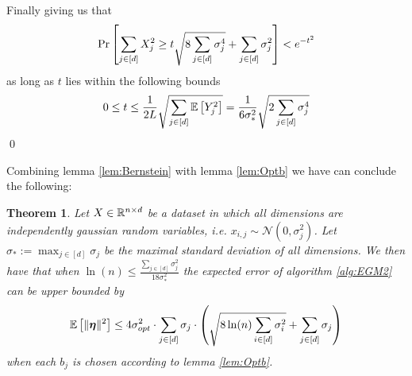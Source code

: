 \documentclass[a4paper,12pt]{article}
\renewenvironment{proof}{{\textit{Proof} \\}}{\qed}
\newtheorem{theorem}{Theorem}
\begin{document}
\begin{proof}
Finally giving us that 
\[
\Pr\left [\sum_{j \in [d]} X_j^2  \ge 
    t \sqrt{ 8 \sum_{j \in [d]}  \sigma_j^4} +
    \sum_{j \in [d]} \sigma_j^2  \right] < e^{-t^2}
\]
as long as $t$ lies within the following bounds
\[
    0 \le t \le \frac{1}{2L} \sqrt{\sum_{j \in [d]} \mathbb{E} \left [ Y_j^2  \right]} =
    \frac{1}{6 \sigma_*^2} \sqrt{2 \sum_{j \in [d]} \sigma_j^4}
\]
\end{proof}

\noindent Combining lemma \ref{lem:Bernstein} with lemma \ref{lem:Optb} 
we have can conclude the following:

\begin{theorem}
\label{theo:Alg3OptErr}
Let $X \in \mathbb{R}^{n \times d}$ be a dataset in which all dimensions are independently gaussian random variables, i.e. $x_{i,j} \sim \mathcal{N}(0, \sigma_j^2)$. 
Let $\sigma_* := \max_{j \in [d]} \sigma_j$ be the maximal standard deviation of all dimensions. We then have that
when $\ln (n) \le \frac{\sum_{j \in [d]} \sigma_j^2}{18 \sigma_*^2}$ the expected error of algorithm \ref{alg:EGM2} can be upper bounded by 
\[
    \mathbb{E} \left [ \| \bm{\eta} \|^2 \right] \le 4\sigma_{opt}^2  \cdot \sum_{j \in [d]} \sigma_j \cdot
    \left ( \sqrt{8\ln(n) \sum_{i \in [d]} \sigma_i^2} + \sum_{j \in [d]} \sigma_j \right)
\]
when each $b_j$ is chosen according to lemma \ref{lem:Optb}.
\end{theorem}
\end{document}
